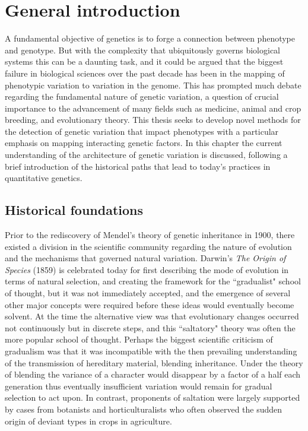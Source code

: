 
\chapter{General introduction}
\label{Introduction}

A fundamental objective of genetics is to forge a connection between phenotype and genotype. But with the complexity that ubiquitously governs biological systems this can be a daunting task, and it could be argued that the biggest failure in biological sciences over the past decade has been in the mapping of phenotypic variation to variation in the genome. This has prompted much debate regarding the fundamental nature of genetic variation, a question of crucial importance to the advancement of many fields such as medicine, animal and crop breeding, and evolutionary theory. This thesis seeks to develop novel methods for the detection of genetic variation that impact phenotypes with a particular emphasis on mapping interacting genetic factors. In this chapter the current understanding of the architecture of genetic variation is discussed, following a brief introduction of the historical paths that lead to today's practices in quantitative genetics.


\section{Historical foundations}

Prior to the rediscovery of Mendel's theory of genetic inheritance in 1900, there existed a division in the scientific community regarding the nature of evolution and the mechanisms that governed natural variation. Darwin's \emph{The Origin of Species} (1859) is celebrated today for first describing the mode of evolution in terms of natural selection, and creating the framework for the ``gradualist" school of thought, but it was not immediately accepted, and the emergence of several other major concepts were required before these ideas would eventually become solvent. At the time the alternative view was that evolutionary changes occurred not continuously but in discrete steps, and this ``saltatory" theory was often the more popular school of thought. Perhaps the biggest scientific criticism of gradualism was that it was incompatible with the then prevailing understanding of the transmission of hereditary material, blending inheritance. Under the theory of blending the variance of a character would disappear by a factor of a half each generation thus eventually insufficient variation would remain for gradual selection to act upon. In contrast, proponents of saltation were largely supported by cases from botanists and horticulturalists who often observed the sudden origin of deviant types in crops in agriculture. 

